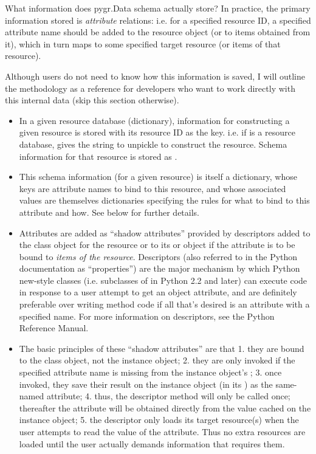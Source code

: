 \documentclass{howto}
\begin{document}
What information does pygr.Data schema actually store?  In practice,
the primary information stored is {\em attribute} relations: 
i.e. for a specified resource ID, a specified attribute name
should be added to the resource object (or to items obtained
from it), which in turn maps to some specified target resource
(or items of that resource).  

Although users do not need to know
how this information is saved, I will outline the methodology
as a reference for developers who want to work directly with this
internal data (skip this section otherwise).
\begin{itemize}
\item In a given resource database (dictionary), information for constructing a 
given resource  is stored with its resource ID as the key.  
i.e. if  is a resource database,  gives
the string to unpickle to construct the resource.  Schema information
for that resource is stored as .

\item This schema information (for a given resource) is itself
a dictionary, whose keys are attribute names to bind to this 
resource, and whose associated values are themselves dictionaries
specifying the rules for what to bind to this attribute and how.
See below for further details.

\item Attributes are added as ``shadow attributes'' provided by 
descriptors added to the class object for the resource or to
its  or  object if the
attribute is to be bound to {\em items of the resource}.  Descriptors
(also referred to in the Python documentation as ``properties'')
are the major mechanism by which Python new-style classes
(i.e. subclasses of  in Python 2.2 and later)
can execute code in response to a user attempt to get an
object attribute, and are definitely preferable over writing
 method code if all that's desired
is an attribute with a specified name.  For more information
on descriptors, see the Python Reference Manual.

\item The basic principles of these ``shadow attributes'' are that
1. they are bound to the class object, not the instance object;
2. they are only invoked if the specified attribute name is 
missing from the instance object's ; 
3. once invoked, they save their
result on the instance object (in its )
as the same-named attribute; 4. thus, the descriptor method
will only be called once; thereafter the attribute will be 
obtained directly from the value cached on the instance object;
5. the descriptor only loads its target resource(s) when the user
attempts to read the value of the attribute.  Thus no extra
resources are loaded until the user actually demands information
that requires them.


\end{itemize}
\end{document}
